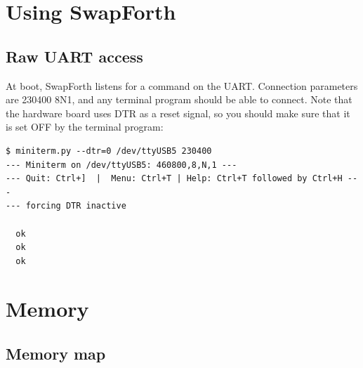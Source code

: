 \chapter{Using SwapForth}

\section{Raw UART access}

At boot, SwapForth listens for a command on the UART. 
Connection parameters are 230400 8N1, and any terminal program should be able to connect.
 
Note that the hardware board uses DTR as a reset signal, so you should make sure that it is set OFF by the terminal program:

\begin{verbatim}
$ miniterm.py --dtr=0 /dev/ttyUSB5 230400
--- Miniterm on /dev/ttyUSB5: 460800,8,N,1 ---
--- Quit: Ctrl+]  |  Menu: Ctrl+T | Help: Ctrl+T followed by Ctrl+H ---
--- forcing DTR inactive

  ok
  ok
  ok
\end{verbatim}


% 
% 



\chapter{Memory}

\section{Memory map}

